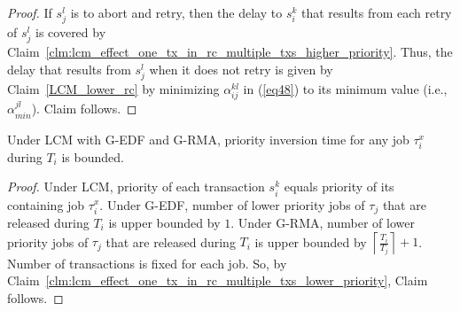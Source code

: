 %
\begin{proof}
%
If $s_j^l$ is to abort and retry, then the delay to $s_i^k$ that results from each retry of $s_j^l$ is covered by Claim~\ref{clm:lcm_effect_one_tx_in_rc_multiple_txs_higher_priority}. Thus, the delay that results from $s_j^l$ when it does not retry is given by Claim~\ref{LCM_lower_rc} by minimizing $\alpha_{ij}^{kl}$ in (\ref{eq48}) to its minimum value (i.e., $\alpha_{min}^{jl}$). Claim follows.
%
\end{proof}
%
\begin{clm}
\label{no priority inversion in lcm}
%
Under LCM with G-EDF and G-RMA, priority inversion time for any job $\tau_i^x$ during $T_i$ is bounded.
\end{clm}
%
\begin{proof}\normalfont
Under LCM, priority of each transaction $s_i^k$ equals priority of its containing job $\tau_i^x$. Under G-EDF, number of lower priority jobs of $\tau_j$ that are released during $T_i$ is upper bounded by $1$. Under G-RMA, number of lower priority jobs of $\tau_j$ that are released during $T_i$ is upper bounded by $\left\lceil\frac{T_i}{T_j}\right\rceil+1$. Number of transactions is fixed for each job. So, by Claim~\ref{clm:lcm_effect_one_tx_in_rc_multiple_txs_lower_priority}, Claim follows.
%
\end{proof}
%
